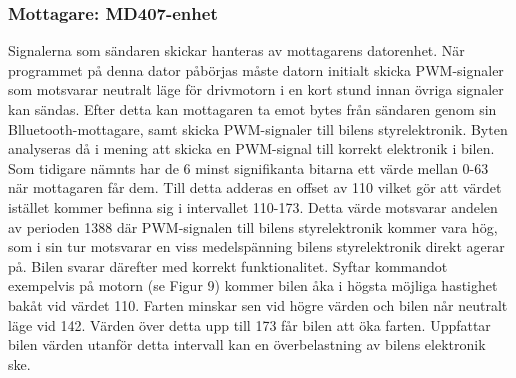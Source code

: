 \documentclass[a4paper]{article}
\begin{document}

\subsubsection{Mottagare: MD407-enhet}
Signalerna som sändaren skickar hanteras av mottagarens datorenhet. När programmet på denna dator påbörjas måste datorn initialt skicka PWM-signaler som motsvarar neutralt läge för drivmotorn i en kort stund innan övriga signaler kan sändas. Efter detta kan mottagaren ta emot bytes från sändaren genom sin Blluetooth-mottagare, samt skicka PWM-signaler till bilens styrelektronik. Byten analyseras då i mening att skicka en PWM-signal till korrekt elektronik i bilen. Som tidigare nämnts har de 6 minst signifikanta bitarna ett värde mellan 0-63 när mottagaren får dem. Till detta adderas en offset av 110 vilket gör att värdet istället kommer befinna sig i intervallet 110-173. Detta värde motsvarar andelen av perioden 1388 där PWM-signalen till bilens styrelektronik kommer vara hög, som i sin tur motsvarar en viss medelspänning bilens styrelektronik direkt agerar på. Bilen svarar därefter med korrekt funktionalitet. Syftar kommandot exempelvis på motorn (se Figur 9) kommer bilen åka i högsta möjliga hastighet bakåt vid värdet 110. Farten minskar sen vid högre värden och bilen når neutralt läge vid 142. Värden över detta upp till 173 får bilen att öka farten. Uppfattar bilen värden utanför detta intervall kan en överbelastning av bilens elektronik ske. 

\end{document}
